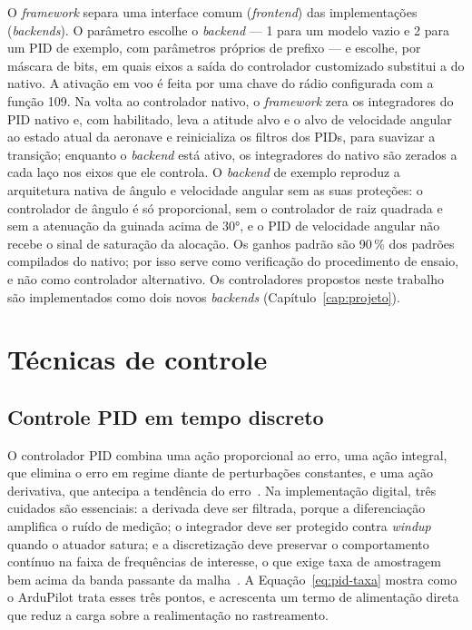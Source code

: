 O \textit{framework} separa uma interface comum (\textit{frontend}) das
implementações (\textit{backends}). O parâmetro  escolhe o
\textit{backend} --- 1 para um modelo vazio e 2 para um PID de exemplo, com
parâmetros próprios de prefixo  --- e 
escolhe, por máscara de bits, em quais eixos a saída do controlador
customizado substitui a do nativo. A ativação em voo é feita por uma chave do
rádio configurada com a função 109. Na volta ao controlador nativo, o
\textit{framework} zera os integradores do PID nativo e, com
 habilitado, leva a atitude alvo e o alvo de
velocidade angular ao estado atual da aeronave e reinicializa os filtros dos
PIDs, para suavizar a transição; enquanto o \textit{backend} está ativo, os
integradores do nativo são zerados a cada laço nos eixos que ele controla. O
\textit{backend} de exemplo reproduz a arquitetura nativa de ângulo e
velocidade angular sem as suas proteções: o controlador de ângulo é só
proporcional, sem o controlador de raiz quadrada e sem a atenuação da guinada
acima de \ang{30}, e o PID de velocidade angular não recebe o sinal de
saturação da alocação. Os ganhos padrão são 90\,\% dos padrões compilados do
nativo; por isso serve como verificação do procedimento de ensaio, e não como
controlador alternativo. Os controladores propostos neste trabalho são
implementados como dois novos
\textit{backends} (Capítulo~\ref{cap:projeto}).

\section{Técnicas de controle}
\label{sec:tecnicas}

\subsection{Controle PID em tempo discreto}

O controlador PID combina uma ação proporcional ao erro, uma ação integral,
que elimina o erro em regime diante de perturbações constantes, e uma ação
derivativa, que antecipa a tendência do erro~\cite{astrom2008,ogata2010}. Na
implementação digital, três cuidados são essenciais: a derivada deve ser
filtrada, porque a diferenciação amplifica o ruído de medição; o integrador
deve ser protegido contra \textit{windup} quando o atuador satura; e a
discretização deve preservar o comportamento contínuo na faixa de frequências
de interesse, o que exige taxa de amostragem bem acima da banda passante da
malha~\cite{franklin1998,wang2020}. A Equação~\eqref{eq:pid-taxa} mostra como o
ArduPilot trata esses três pontos, e acrescenta um termo de alimentação
direta que reduz a carga sobre a realimentação no rastreamento.

